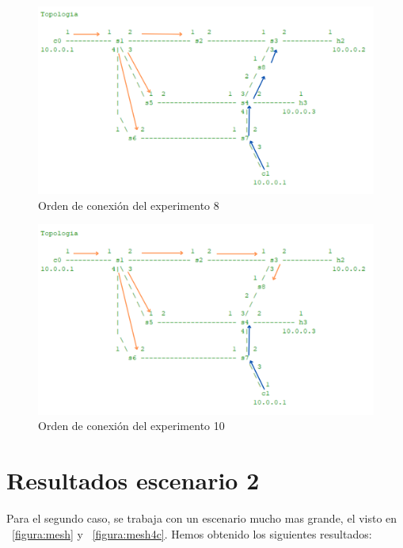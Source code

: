 \documentclass[a4paper, 12pt]{book}
\begin{document}
 	\begin{figure}[H]
 		\centering
 		\includegraphics[width=16cm, keepaspectratio]{img/escenario1_2c_7}
 		\caption{Orden de conexión del experimento 8}
 		\label{figura:escenario1_2c_7}
 	\end{figure}
 	
 	\begin{figure}[H]
 		\centering
 		\includegraphics[width=16cm, keepaspectratio]{img/escenario1_2c_8}
 		\caption{Orden de conexión del experimento 10}
 		\label{figura:escenario1_2c_8}
 	\end{figure}
 	
 	\section{Resultados escenario 2} 
 	\label{sec:resultEsc2}
 	
 	Para el segundo caso, se trabaja con un escenario mucho mas grande, el visto en ~\ref{figura:mesh} y ~\ref{figura:mesh4c}. Hemos obtenido los siguientes resultados:
 	
\end{document}
